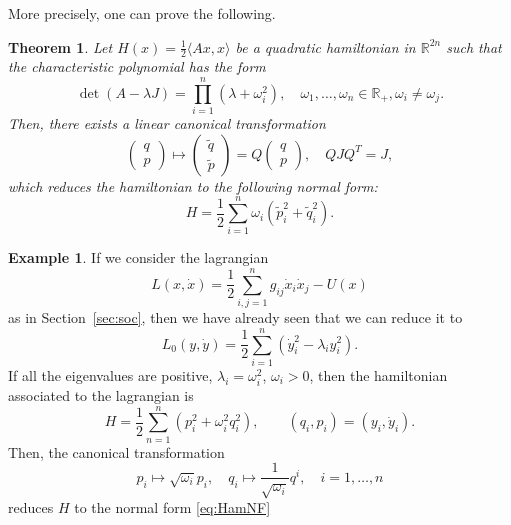 \documentclass[english,fontsize=11pt,paper=b5]{scrbook}
\newtheorem{theorem}{Theorem}[chapter]
\theoremstyle{definition}
\newtheorem{example}{Example}[chapter]
\begin{document}
      More precisely, one can prove the following.
      \begin{theorem}
        Let $H(x) = \frac12\langle Ax,x \rangle$ be a quadratic hamiltonian in $\mathbb{R}^{2n}$
        such that the characteristic polynomial has the form
        \begin{equation}
          \det(A-\lambda J) = \prod_{i=1}^n(\lambda + \omega_i^2), \quad \omega_1, \ldots, \omega_n \in \mathbb{R}_+, \omega_i\neq\omega_j.
        \end{equation}
        Then, there exists a linear canonical transformation
        \begin{equation}
          \begin{pmatrix}
            q \\ p
          \end{pmatrix}
          \mapsto
          \begin{pmatrix}
            \widetilde q \\ \widetilde p
          \end{pmatrix}
          = Q
          \begin{pmatrix}
            q \\ p
          \end{pmatrix},
          \quad QJQ^T = J,
        \end{equation}
        which reduces the hamiltonian to the following \emph{normal form}:
        \begin{equation}\label{eq:HamNF}
          H = \frac12 \sum_{i=1}^n \omega_i(\widetilde p_i^2 + \widetilde q_i^2).
        \end{equation}
      \end{theorem}

      \begin{example}
        If we consider the lagrangian
        \begin{equation}
          L(x,\dot x) = \frac12 \sum_{i,j=1}^n g_{ij}\dot x_i \dot x_j - U(x)
        \end{equation}
        as in Section~\ref{sec:soc}, then we have already seen that we can reduce it to
        \begin{equation}
          L_0(y,\dot y) = \frac12 \sum_{i=1}^n(\dot y_i^2 - \lambda_i y_i^2).
        \end{equation}
        If all the eigenvalues are positive, $\lambda_i = \omega_i^2$, $\omega_i > 0$, then the hamiltonian associated to the lagrangian is
        \begin{equation}
          H = \frac12 \sum_{n=1}^n(p_i^2 + \omega_i^2 q_i^2), \qquad (q_i, p_i) = (y_i, \dot y_i).
        \end{equation}
        Then, the canonical transformation
        \begin{equation}
          p_i \mapsto \sqrt{\omega_i}p_i, \quad q_i \mapsto \frac{1}{\sqrt{\omega_i}}q^i, \quad i=1,\ldots,n
        \end{equation}
        reduces $H$ to the normal form \eqref{eq:HamNF}
      \end{example}
\end{document}

